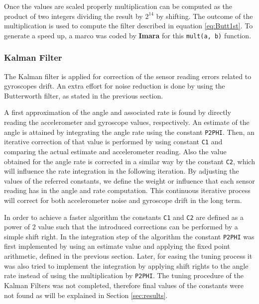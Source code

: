 \documentclass{article}
\begin{document}
Once the values are scaled properly multiplication can be computed as the product of two integers dividing the result by $2^{14}$ by shifting. The outcome of the multiplication is used to compute the filter described in equation \ref{eq:Butt1st}. To generate a speed up, a marco was coded by \textbf{Imara} for this \texttt{mult(a, b)} function. 

\subsubsection{Kalman Filter}

The Kalman filter is applied for correction of the sensor reading errors related to gyroscopes drift. An extra effort for noise reduction is done by using the Butterworth filter, as stated in the previous section.

A first approximation of the angle and associated rate is found by directly reading the accelerometer and gyroscope values, respectively. An estimate of the angle is attained by integrating the angle rate using the constant \texttt{P2PHI}. Then, an iterative correction of that value is performed by using constant \texttt{C1} and comparing the actual estimate and accelerometer reading. Also the value obtained for the angle rate is corrected in a similar way by the constant \texttt{C2}, which will influence the rate integration in the following iteration. By adjusting the values of the referred constants, we define the weight or influence that each sensor reading has in the angle and rate computation. This continuous iterative process will correct for both accelerometer noise and gyroscope drift in the long term.

In order to achieve a faster algorithm the constants \texttt{C1} and \texttt{C2} are defined as a power of $2$ value such that the introduced corrections can be performed by a simple shift right. In the integration step of the algorithm the constant \texttt{P2PHI} was first implemented by using an estimate value and applying the fixed point arithmetic, defined in the previous section. Later, for easing the tuning process it was also tried to implement the integration by applying shift rights to the angle rate instead of using the multiplication by \texttt{P2PHI}. The tuning procedure of the Kalman Filters was not completed, therefore final values of the constants were not found as will be explained in Section \ref{sec:results}.


\end{document}
